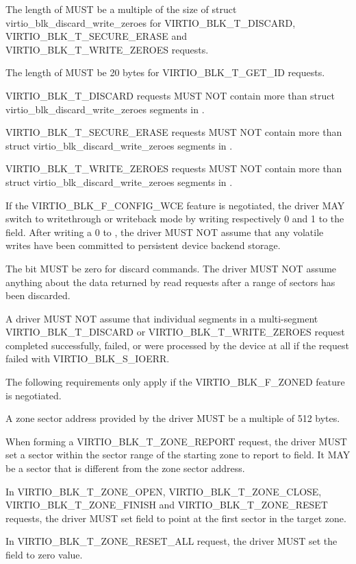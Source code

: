 The length of  MUST be a multiple of the size of struct
virtio_blk_discard_write_zeroes for VIRTIO_BLK_T_DISCARD,
VIRTIO_BLK_T_SECURE_ERASE and VIRTIO_BLK_T_WRITE_ZEROES requests.

The length of  MUST be 20 bytes for VIRTIO_BLK_T_GET_ID requests.

VIRTIO_BLK_T_DISCARD requests MUST NOT contain more than
 struct virtio_blk_discard_write_zeroes segments in
.

VIRTIO_BLK_T_SECURE_ERASE requests MUST NOT contain more than
 struct virtio_blk_discard_write_zeroes segments in
.

VIRTIO_BLK_T_WRITE_ZEROES requests MUST NOT contain more than
 struct virtio_blk_discard_write_zeroes segments in
.

If the VIRTIO_BLK_F_CONFIG_WCE feature is negotiated, the driver MAY
switch to writethrough or writeback mode by writing respectively 0 and
1 to the  field.  After writing a 0 to ,
the driver MUST NOT assume that any volatile writes have been committed
to persistent device backend storage.

The  bit MUST be zero for discard commands.  The driver
MUST NOT assume anything about the data returned by read requests after
a range of sectors has been discarded.

A driver MUST NOT assume that individual segments in a multi-segment
VIRTIO_BLK_T_DISCARD or VIRTIO_BLK_T_WRITE_ZEROES request completed
successfully, failed, or were processed by the device at all if the request
failed with VIRTIO_BLK_S_IOERR.

The following requirements only apply if the VIRTIO_BLK_F_ZONED feature is
negotiated.

A zone sector address provided by the driver MUST be a multiple of 512 bytes.

When forming a VIRTIO_BLK_T_ZONE_REPORT request, the driver MUST set a sector
within the sector range of the starting zone to report to  field.
It MAY be a sector that is different from the zone sector address.

In VIRTIO_BLK_T_ZONE_OPEN, VIRTIO_BLK_T_ZONE_CLOSE, VIRTIO_BLK_T_ZONE_FINISH and
VIRTIO_BLK_T_ZONE_RESET requests, the driver MUST set  field to
point at the first sector in the target zone.

In VIRTIO_BLK_T_ZONE_RESET_ALL request, the driver MUST set the field
 to zero value.

